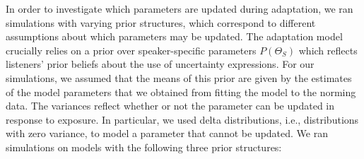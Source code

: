 In order to investigate which parameters are updated during adaptation, we ran simulations
with varying prior structures, which correspond to different assumptions about which parameters may be updated.
The adaptation model crucially relies on a prior over speaker-specific parameters $P(\Theta_S)$
which reflects listeners' prior beliefs about the use of uncertainty expressions. For our simulations,
we assumed that the means of this prior are given by the estimates of the model parameters that 
we obtained from fitting the model to the norming data. The variances reflect whether or not the parameter can be updated in response to exposure. In particular, we used delta distributions, i.e., distributions with zero variance, to model a parameter that cannot be updated. We ran simulations on models with the following three prior structures:


